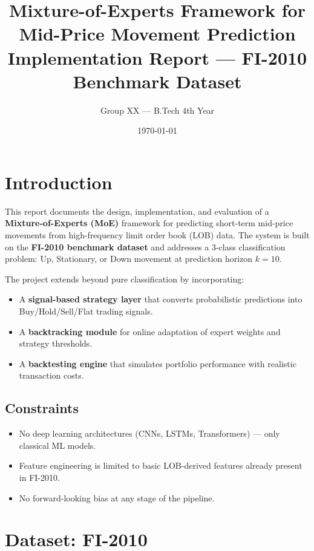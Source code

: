 \documentclass[12pt, a4paper]{article}
\title{%
  \textbf{Mixture-of-Experts Framework for Mid-Price Movement Prediction} \\[0.5em]
  \large Implementation Report — FI-2010 Benchmark Dataset
}
\author{Group XX — B.Tech 4th Year}
\date{\today}
\begin{document}
\maketitle
\tableofcontents
\newpage

\section{Introduction}

This report documents the design, implementation, and evaluation of a \textbf{Mixture-of-Experts (MoE)} framework for predicting short-term mid-price movements from high-frequency limit order book (LOB) data. The system is built on the \textbf{FI-2010 benchmark dataset} and addresses a 3-class classification problem: Up, Stationary, or Down movement at prediction horizon $k=10$.

The project extends beyond pure classification by incorporating:
\begin{itemize}
  \item A \textbf{signal-based strategy layer} that converts probabilistic predictions into Buy/Hold/Sell/Flat trading signals.
  \item A \textbf{backtracking module} for online adaptation of expert weights and strategy thresholds.
  \item A \textbf{backtesting engine} that simulates portfolio performance with realistic transaction costs.
\end{itemize}

\subsection{Constraints}
\begin{itemize}
  \item No deep learning architectures (CNNs, LSTMs, Transformers) — only classical ML models.
  \item Feature engineering is limited to basic LOB-derived features already present in FI-2010.
  \item No forward-looking bias at any stage of the pipeline.
\end{itemize}

\section{Dataset: FI-2010}
\end{document}
